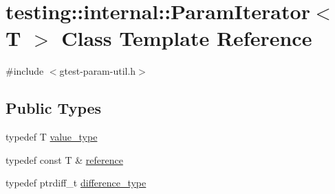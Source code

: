 \hypertarget{classtesting_1_1internal_1_1ParamIterator}{}\section{testing\+::internal\+::Param\+Iterator$<$ T $>$ Class Template Reference}
\label{classtesting_1_1internal_1_1ParamIterator}


{\ttfamily \#include $<$gtest-\/param-\/util.\+h$>$}

\subsection*{Public Types}
\begin{DoxyCompactItemize}
\item 
typedef T \mbox{\hyperlink{classtesting_1_1internal_1_1ParamIterator_a4afe3a68db0d0744753c8afe262e35df}{value\+\_\+type}}
\item 
typedef const T \& \mbox{\hyperlink{classtesting_1_1internal_1_1ParamIterator_ac96f133ffa06fc0f9faff5a1c7954382}{reference}}
\item 
typedef ptrdiff\+\_\+t \mbox{\hyperlink{classtesting_1_1internal_1_1ParamIterator_a6c37240a04ba3fc4c56f6c413cf4771d}{difference\+\_\+type}}
\end{DoxyCompactItemize}
